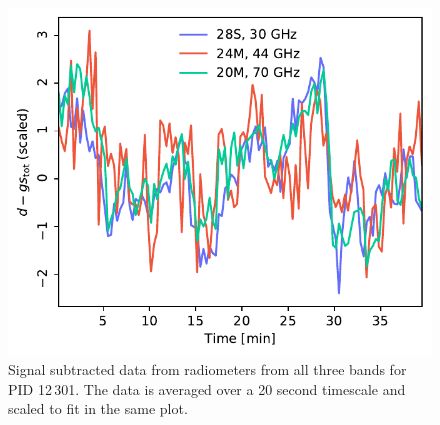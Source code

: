 \documentclass[twocolumn]{aa}
\begin{document}
\begin{figure}
	\begin{center}
		\includegraphics[width=\linewidth]{figs/ncorr_compare_12301.pdf}
	\end{center}
	\caption{Signal subtracted data from radiometers from all three bands for PID 12\,301. The data is averaged over a 20 second timescale and scaled to fit in the same plot. 
		\label{fig:data_compare_corr}}
\end{figure}
\end{document}
